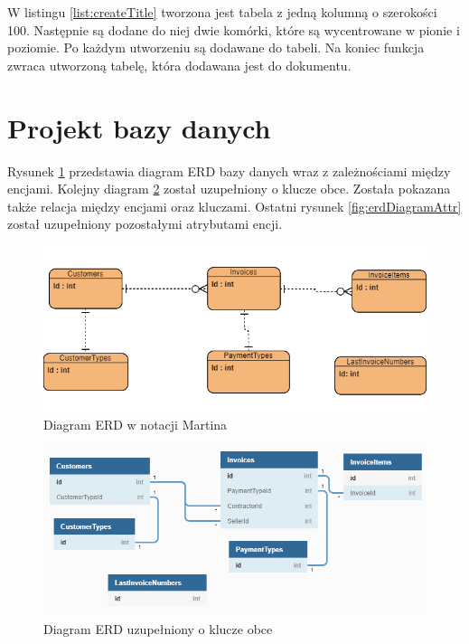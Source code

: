 W listingu \ref{list:createTitle} tworzona jest tabela z jedną kolumną o szerokości 100. Następnie są dodane do niej dwie komórki, które są wycentrowane w pionie i poziomie. Po każdym utworzeniu są dodawane do tabeli. Na koniec funkcja zwraca utworzoną tabelę, która dodawana jest do dokumentu.

\section{Projekt bazy danych}

Rysunek \ref{fig:erdDiagram} przedstawia diagram ERD bazy danych wraz z zależnościami między encjami. Kolejny diagram \ref{fig:erdDiagramForeign} został uzupełniony o klucze obce. Została pokazana także relacja między encjami oraz kluczami. Ostatni rysunek \ref{fig:erdDiagramAttr} został uzupełniony pozostałymi atrybutami encji.

\begin{figure}[ht!]
  \includegraphics[width=\linewidth]{Rysunki/ERD.png}
  \caption{Diagram ERD w notacji Martina}
  \label{fig:erdDiagram}
\end{figure}

\begin{figure}[ht!]
  \includegraphics[width=\linewidth]{Rysunki/ERD-relacje.png}
  \caption{Diagram ERD uzupełniony o klucze obce}
  \label{fig:erdDiagramForeign}
\end{figure}

